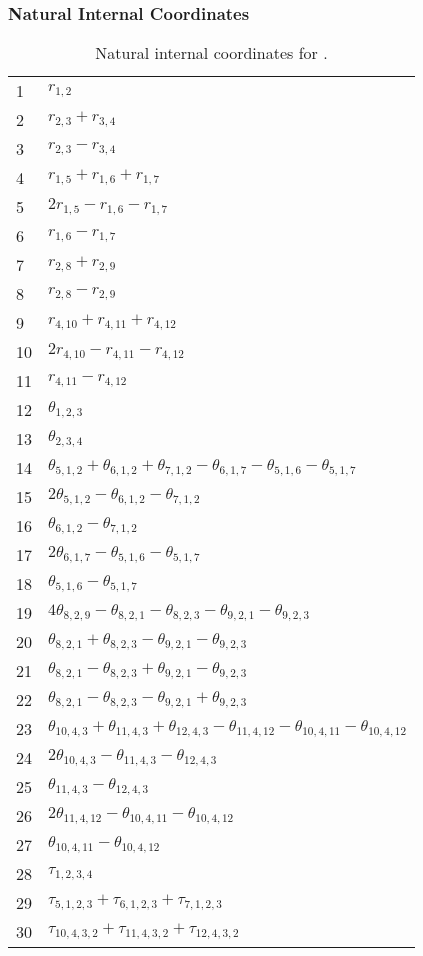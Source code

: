 \documentclass[10pt,oneside]{article}
\begin{document}
\begin{table}[h!]
\subsubsection*{Natural Internal Coordinates}
\centering
\caption{Natural internal coordinates for .}
\small
\begin{tabular}{ll}
\toprule
  1   & $r_{1,2}$ \\
  2   & $r_{2,3} + r_{3,4}$ \\
  3   & $r_{2,3} - r_{3,4}$ \\
  4   & $r_{1,5} + r_{1,6} + r_{1,7}$ \\
  5   & $2r_{1,5} - r_{1,6} - r_{1,7}$ \\
  6   & $r_{1,6} - r_{1,7}$ \\
  7   & $r_{2,8} + r_{2,9}$ \\
  8   & $r_{2,8} - r_{2,9}$ \\
  9   & $r_{4,10} + r_{4,11} + r_{4,12}$ \\
  10  & $2r_{4,10} - r_{4,11} - r_{4,12}$ \\
  11  & $r_{4,11} - r_{4,12}$ \\
  12  & $\theta_{1,2,3}$ \\
  13  & $\theta_{2,3,4}$ \\
  14  & $\theta_{5,1,2} + \theta_{6,1,2} + \theta_{7,1,2} - \theta_{6,1,7} - \theta_{5,1,6} - \theta_{5,1,7}$ \\
  15  & $2\theta_{5,1,2} - \theta_{6,1,2} - \theta_{7,1,2}$ \\
  16  & $\theta_{6,1,2} - \theta_{7,1,2}$ \\
  17  & $2\theta_{6,1,7} - \theta_{5,1,6} - \theta_{5,1,7}$ \\
  18  & $\theta_{5,1,6} - \theta_{5,1,7}$ \\
  19  & $4\theta_{8,2,9} - \theta_{8,2,1} - \theta_{8,2,3} - \theta_{9,2,1} - \theta_{9,2,3}$ \\
  20  & $\theta_{8,2,1} + \theta_{8,2,3} - \theta_{9,2,1} - \theta_{9,2,3}$ \\
  21  & $\theta_{8,2,1} - \theta_{8,2,3} + \theta_{9,2,1} - \theta_{9,2,3}$ \\
  22  & $\theta_{8,2,1} - \theta_{8,2,3} - \theta_{9,2,1} + \theta_{9,2,3}$ \\
  23  & $\theta_{10,4,3} + \theta_{11,4,3} + \theta_{12,4,3} - \theta_{11,4,12} - \theta_{10,4,11} - \theta_{10,4,12}$ \\
  24  & $2\theta_{10,4,3} - \theta_{11,4,3} - \theta_{12,4,3}$ \\
  25  & $\theta_{11,4,3} - \theta_{12,4,3}$ \\
  26  & $2\theta_{11,4,12} - \theta_{10,4,11} - \theta_{10,4,12}$ \\
  27  & $\theta_{10,4,11} - \theta_{10,4,12}$ \\
  28  & $\tau_{1,2,3,4}$ \\
  29  & $\tau_{5,1,2,3} + \tau_{6,1,2,3} + \tau_{7,1,2,3}$ \\
  30  & $\tau_{10,4,3,2} + \tau_{11,4,3,2} + \tau_{12,4,3,2}$ \\
\bottomrule
\end{tabular}
\end{table}
\end{document}
